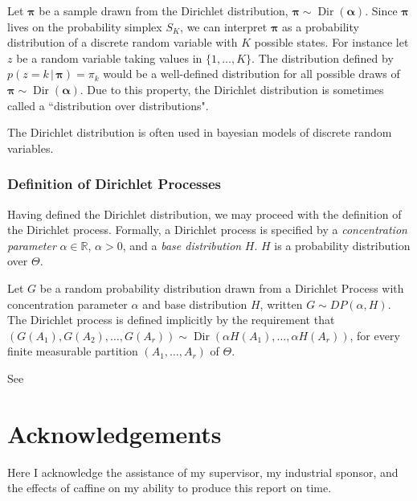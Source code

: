 \documentclass[final,3p,times,twocolumn]{elsarticle}
\DeclareMathOperator*{\Dir}{Dir}
\let\bs\boldsymbol
\begin{document}
Let $\bs \pi$ be a sample drawn from the Dirichlet distribution, $\bs \pi \sim \Dir(\bs \alpha)$.
Since $\bs \pi$ lives on the probability simplex $S_K$, we can interpret $\bs \pi$ as a probability distribution of a discrete random variable with $K$ possible states.
For instance let $z$ be a random variable taking values in $\{1, \dots, K\}$.
The distribution defined by $p(z = k \,|\, \bs \pi) = \pi_k$ would be a well-defined distribution for all possible draws of $\bs \pi \sim \Dir(\bs \alpha)$.
Due to this property, the Dirichlet distribution is sometimes called a ``distribution over distributions".

The Dirichlet distribution is often used in bayesian models of discrete random variables. 

\subsubsection{Definition of Dirichlet Processes}
Having defined the Dirichlet distribution, we may proceed with the definition of the Dirichlet process.
Formally, a Dirichlet process is specified by a \emph{concentration parameter} $\alpha \in \mathbb{R}$, $\alpha > 0$, and a \emph{base distribution} $H$.
$H$ is a probability distribution over $\Theta$.

Let $G$ be a random probability distribution drawn from a Dirichlet Process with concentration parameter $\alpha$ and base distribution $H$, written $G \sim DP(\alpha, H)$.
The Dirichlet process is defined implicitly by the requirement that $(G(A_1),G(A_2),\dots,G(A_r)) \sim \Dir(\alpha H(A_1),\dots, \alpha H(A_r))$, for every finite measurable partition $(A_1,\dots,A_r)$ of $\Theta$.

See \cite{Murphy}

\section*{Acknowledgements}
Here I acknowledge the assistance of my supervisor, my industrial sponsor,
and the effects of caffine on my ability to produce this report on time.

\appendix

\end{document}
